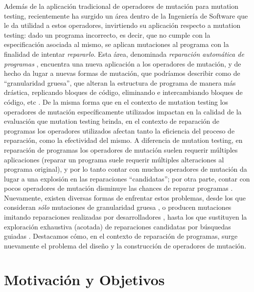 Adem\'as de la aplicaci\'on tradicional de operadores de mutaci\'on para mutation testing, recientemente ha surgido un \'area dentro de la Ingenier\'ia de Software que le da utilidad a estos operadores, invirtiendo su aplicaci\'on respecto a mutation testing: dado un programa incorrecto, es decir, que no cumple con la especificaci\'on asociada al mismo, se aplican mutaciones al programa con la finalidad de intentar \emph{repararlo}. Esta \'area, denominada \emph{reparaci\'on autom\'atica de programas} \cite{DBLP:journals/cacm/Harman10}, encuentra una nueva aplicaci\'on a los operadores de mutaci\'on, y de hecho da lugar a nuevas formas de mutaci\'on, que podr\'iamos describir como de ``granularidad gruesa'', que alteran la estructura de programa de manera m\'as dr\'astica, replicando bloques de c\'odigo, eliminando e intercambiando bloques de c\'odigo, etc \cite{bibliography.repair.GouesNFW12}. De la misma forma que en el contexto de mutation testing los operadores de mutaci\'on espec\'ificamente utilizados impactan en la calidad de la evaluaci\'on que mutation testing brinda, en el contexto de reparaci\'on de programas los operadores utilizados afectan tanto la eficiencia del proceso de reparaci\'on, como la efectividad del mismo. A diferencia de mutation testing, en reparaci\'on de programas los operadores de mutaci\'on suelen requerir m\'ultiples aplicaciones (reparar un programa suele requerir m\'ultiples alteraciones al programa original), y por lo tanto contar con muchos operadores de mutaci\'on da lugar a una explosi\'on en las reparaciones ``candidatas''; por otra parte, contar con pocos operadores de mutaci\'on disminuye las chances de reparar programas \cite{bibliography.repair.GouesNFW12}. Nuevamente, existen diversas formas de enfrentar estos problemas, desde los que consideran \emph{s\'olo} mutaciones de granularidad gruesa \cite{bibliography.repair.GouesNFW12}, o producen mutaciones imitando reparaciones realizadas por desarrolladores \cite{bibliography.repair.KimNSK13}, hasta los que sustituyen la exploraci\'on exhaustiva (acotada) de reparaciones candidatas por b\'usquedas guiadas \cite{bibliography.repair.GouesNFW12,bibliography.repair.StaberJB05,bibliography.repair.ArcuriY08}. Destacamos c\'omo, en el contexto de reparaci\'on de programas, surge nuevamente el problema del dise\~no y la construcci\'on de operadores de mutaci\'on.    


\section{Motivaci\'on y Objetivos}
\label{sec:intro.objetivos}


